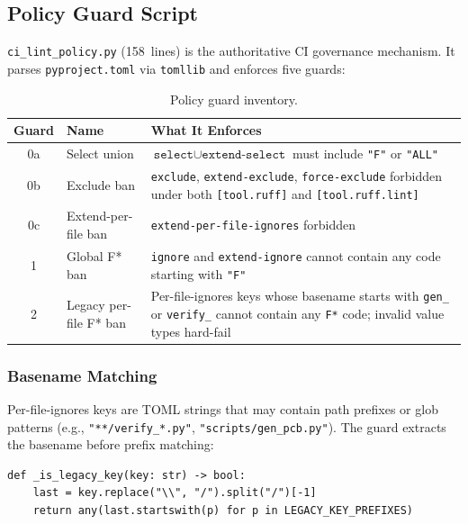 \documentclass[11pt,a4paper]{article}
\begin{document}
\subsection{Policy Guard Script}
\label{sec:guard}

\texttt{ci\_lint\_policy.py} (158~lines) is the authoritative CI governance
mechanism. It parses \texttt{pyproject.toml} via \texttt{tomllib} and enforces
five guards:

\begin{table}[H]
\centering
\caption{Policy guard inventory.}
\label{tab:guards}
\begin{tabular}{@{}clp{7.5cm}@{}}
\toprule
\textbf{Guard} & \textbf{Name} & \textbf{What It Enforces} \\
\midrule
0a & Select union & $\texttt{select} \cup \texttt{extend-select}$ must include
     \texttt{"F"} or \texttt{"ALL"} \\
0b & Exclude ban & \texttt{exclude}, \texttt{extend-exclude},
     \texttt{force-exclude} forbidden under both \texttt{[tool.ruff]} and
     \texttt{[tool.ruff.lint]} \\
0c & Extend-per-file ban & \texttt{extend-per-file-ignores} forbidden \\
1  & Global F* ban & \texttt{ignore} and \texttt{extend-ignore} cannot contain
     any code starting with \texttt{"F"} \\
2  & Legacy per-file F* ban & Per-file-ignores keys whose basename starts with
     \texttt{gen\_} or \texttt{verify\_} cannot contain any \texttt{F*} code;
     invalid value types hard-fail \\
\bottomrule
\end{tabular}
\end{table}

\subsubsection{Basename Matching}

Per-file-ignores keys are TOML strings that may contain path prefixes or glob
patterns (e.g., \texttt{"**/verify\_*.py"}, \texttt{"scripts/gen\_pcb.py"}).
The guard extracts the basename before prefix matching:

\begin{lstlisting}[caption={Basename extraction for glob-safe legacy key matching.},label={lst:basename}]
def _is_legacy_key(key: str) -> bool:
    last = key.replace("\\", "/").split("/")[-1]
    return any(last.startswith(p) for p in LEGACY_KEY_PREFIXES)
\end{lstlisting}
\end{document}
